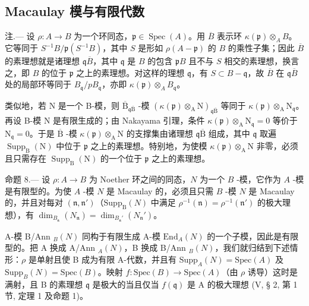 \subsection{Macaulay 模与有限代数}

注.--- 设 \(\rho: A \to B\) 为一个环同态，\(\mathfrak{p} \in \operatorname{Spec}(A)\)。用 \(\overline{B}\) 表示环 \(\kappa(\mathfrak{p}) \otimes_{A} B\)。它等同于 \(S^{-1}B/\mathfrak{p}(S^{-1}B)\)，其中 \(S\) 是形如 \(\rho(A - \mathfrak{p})\) 的 \(B\) 的乘性子集；因此 \(\overline{B}\) 的素理想就是诸理想 \(\mathfrak{q}\overline{B}\)，其中 \(\mathfrak{q}\) 是 \(B\) 的包含 \(\mathfrak{p}B\) 且不与 \(S\) 相交的素理想，换言之，即 \(B\) 的位于 \(\mathfrak{p}\) 之上的素理想。对这样的理想 \(\mathfrak{q}\)，有 \(S \subset B - \mathfrak{q}\)，故 \(\overline{B}\) 在 \(\mathfrak{q}\overline{B}\) 处的局部环等同于 \(B_{\mathfrak{q}}/pB_{\mathfrak{q}}\)，亦即 \(\kappa(\mathfrak{p}) \otimes_{A} B_{\mathfrak{q}}\)。

类似地，若 N 是一个 B-模，则 \(\overline{\mathrm{B}}_{\mathfrak{q}\overline{\mathrm{B}}}\) -模 \(\left(\kappa(\mathfrak{p})\otimes_{\mathrm{A}}\mathrm{N}\right)_{\mathfrak{q}\overline{\mathrm{B}}}\) 等同于 \(\kappa(\mathfrak{p})\otimes_{\mathrm{A}}\mathrm{N}_{\mathfrak{q}}\)。再设 B-模 N 是有限生成的；由 Nakayama 引理，条件 \(\kappa(\mathfrak{p})\otimes_{\mathrm{A}}\mathrm{N}_{\mathfrak{q}}=0\) 等价于 \(\mathrm{N}_{\mathfrak{q}}=0\)。于是 \(\overline{\mathrm{B}}\) -模 \(\kappa(\mathfrak{p})\otimes_{\mathrm{A}}\mathrm{N}\) 的支撑集由诸理想 \(\mathfrak{q}\overline{\mathrm{B}}\) 组成，其中 \(\mathfrak{q}\) 取遍 \(\operatorname{Supp}_{\mathrm{B}}(\mathrm{N})\) 中位于 \(\mathfrak{p}\) 之上的素理想。特别地，为使模 \(\kappa(\mathfrak{p})\otimes_{\mathrm{A}}\mathrm{N}\) 非零，必须且只需存在 \(\operatorname{Supp}_{\mathrm{B}}(\mathrm{N})\) 的一个位于 \(\mathfrak{p}\) 之上的素理想。

命题 8.--- 设 \(\rho: A \to B\) 为 Noether 环之间的同态，\(N\) 为一个 \(B\) -模，它作为 \(A\) -模是有限型的。为使 \(A\) -模 \(N\) 是 Macaulay 的，必须且只需 \(B\) -模 \(N\) 是 Macaulay 的，并且对每对 \((\mathfrak{n}, \mathfrak{n}')\)（\(\mathrm{Supp}_{\mathrm{B}}(N)\) 中满足 \(\rho^{-1}(\mathfrak{n}) = \rho^{-1}(\mathfrak{n}')\) 的极大理想），有 \(\dim_{B_{\mathfrak{n}}} (N_{\mathfrak{n}}) = \dim_{B_{\mathfrak{n}}'} (N_{\mathfrak{n}}')\)。

A-模 B/Ann \(_B(N)\) 同构于有限生成 A-模 \(\text{End}_A(N)\) 的一个子模，因此是有限型的。把 A 换成 A/Ann \(_A(N)\)，B 换成 B/Ann \(_B(N)\)，我们就归结到下述情形：\(\rho\) 是单射且使 B 成为有限 A-代数，并且有 \(\text{Supp}_A(N) = \text{Spec}(A)\) 及 \(\text{Supp}_B(N) = \text{Spec}(B)\)。映射 \(f: \text{Spec}(B) \to \text{Spec}(A)\)（由 \(\rho\) 诱导）这时是满射，且 B 的素理想 \(\mathfrak{q}\) 是极大的当且仅当 \(f(\mathfrak{q})\) 是 A 的极大理想 (V, § 2, 第 1 节, 定理 1 及命题 1)。

